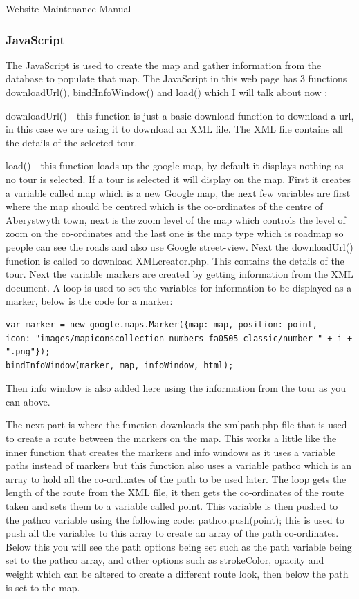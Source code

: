 \documentclass{article}
\begin{document}
\begin{section}{Website Maintenance Manual}
		\subsubsection{JavaScript}
		The JavaScript is used to create the map and gather information from the database to populate that map. The JavaScript in this web page has 3 functions downloadUrl(), bindfInfoWindow() and load() which I will talk about now :

downloadUrl() - this function is just a basic download function to download a url, in this case we are using it to download an XML file. The XML file contains all the details of the selected tour. 

load() - this function loads up the google map, by default it displays nothing as no tour is selected. If a tour is selected it will display on the map. First it creates a variable called map which is a new Google map, the next few variables are first where the map should be centred which is the co-ordinates of the centre of Aberystwyth town, next is the zoom level of the map which controls the level of zoom on the co-ordinates and the last one is the map type which is roadmap so people can see the roads and also use Google street-view. Next the downloadUrl() function is called to download XMLcreator.php. This contains the details of the tour. Next the variable markers are created by getting information from the XML document. A loop is used to set the variables for information to be displayed as a marker, below is the code for a marker:

\begin{verbatim}
var marker = new google.maps.Marker({map: map, position: point,
icon: "images/mapiconscollection-numbers-fa0505-classic/number_" + i + ".png"});
bindInfoWindow(marker, map, infoWindow, html);
\end{verbatim}

Then info window is also added here using the information from the tour as you can above.

		The next part is where the function downloads the xmlpath.php file that is used to create a route between the markers on the map. This works a little like the inner function that creates the markers and info windows as it uses a variable paths instead of markers but this function also uses a variable pathco which is an array to hold all the co-ordinates of the path to be used later. The loop gets the length of the route from the XML file, it then gets the co-ordinates of the route taken and sets them to a variable called point. This variable is then pushed to the pathco variable using the following code:    pathco.push(point);    this is used to push all the variables to this array to create an array of the path co-ordinates. Below this you will see the path options being set such as the path variable being set to the pathco array, and other options such as strokeColor, opacity and weight which can be altered to create a different route look, then below the path is set to the map.


\end{section}
\end{document}
